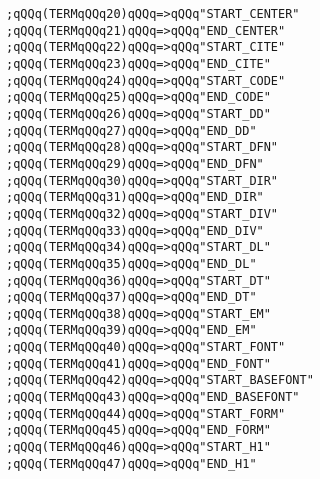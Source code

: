 \verb|;qQQq(TERMqQQq20)qQQq=>qQQq"START_CENTER"|\newline
\verb|;qQQq(TERMqQQq21)qQQq=>qQQq"END_CENTER"|\newline
\verb|;qQQq(TERMqQQq22)qQQq=>qQQq"START_CITE"|\newline
\verb|;qQQq(TERMqQQq23)qQQq=>qQQq"END_CITE"|\newline
\verb|;qQQq(TERMqQQq24)qQQq=>qQQq"START_CODE"|\newline
\verb|;qQQq(TERMqQQq25)qQQq=>qQQq"END_CODE"|\newline
\verb|;qQQq(TERMqQQq26)qQQq=>qQQq"START_DD"|\newline
\verb|;qQQq(TERMqQQq27)qQQq=>qQQq"END_DD"|\newline
\verb|;qQQq(TERMqQQq28)qQQq=>qQQq"START_DFN"|\newline
\verb|;qQQq(TERMqQQq29)qQQq=>qQQq"END_DFN"|\newline
\verb|;qQQq(TERMqQQq30)qQQq=>qQQq"START_DIR"|\newline
\verb|;qQQq(TERMqQQq31)qQQq=>qQQq"END_DIR"|\newline
\verb|;qQQq(TERMqQQq32)qQQq=>qQQq"START_DIV"|\newline
\verb|;qQQq(TERMqQQq33)qQQq=>qQQq"END_DIV"|\newline
\verb|;qQQq(TERMqQQq34)qQQq=>qQQq"START_DL"|\newline
\verb|;qQQq(TERMqQQq35)qQQq=>qQQq"END_DL"|\newline
\verb|;qQQq(TERMqQQq36)qQQq=>qQQq"START_DT"|\newline
\verb|;qQQq(TERMqQQq37)qQQq=>qQQq"END_DT"|\newline
\verb|;qQQq(TERMqQQq38)qQQq=>qQQq"START_EM"|\newline
\verb|;qQQq(TERMqQQq39)qQQq=>qQQq"END_EM"|\newline
\verb|;qQQq(TERMqQQq40)qQQq=>qQQq"START_FONT"|\newline
\verb|;qQQq(TERMqQQq41)qQQq=>qQQq"END_FONT"|\newline
\verb|;qQQq(TERMqQQq42)qQQq=>qQQq"START_BASEFONT"|\newline
\verb|;qQQq(TERMqQQq43)qQQq=>qQQq"END_BASEFONT"|\newline
\verb|;qQQq(TERMqQQq44)qQQq=>qQQq"START_FORM"|\newline
\verb|;qQQq(TERMqQQq45)qQQq=>qQQq"END_FORM"|\newline
\verb|;qQQq(TERMqQQq46)qQQq=>qQQq"START_H1"|\newline
\verb|;qQQq(TERMqQQq47)qQQq=>qQQq"END_H1"|\newline
